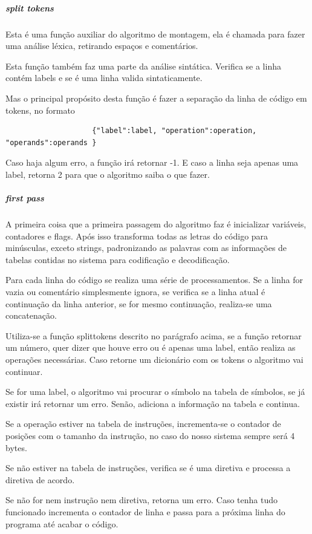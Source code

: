 			\subparagraph{split tokens}
				Esta é uma função auxiliar do algoritmo de montagem, ela é chamada para fazer uma análise léxica, retirando espaços e comentários. 

				Esta função também faz uma parte da análise sintática. Verifica se a linha contém labels e se é uma linha valida sintaticamente.

				Mas o principal propósito desta função é fazer a separação da linha de código em tokens, no formato

				\begin{verbatim}
					{"label":label, "operation":operation, "operands":operands }
				\end{verbatim}

				Caso haja algum erro, a função irá retornar -1. E caso a linha seja apenas uma label, retorna 2 para que o algoritmo saiba o que fazer.

			\subparagraph{first pass}						
				
				A primeira coisa que a primeira passagem do algoritmo faz é inicializar variáveis, contadores e flags. Após isso transforma todas as letras do código para minúsculas, exceto strings, padronizando as palavras com as informações de tabelas contidas no sistema para codificação e decodificação.

				Para cada linha do código se realiza uma série de processamentos. Se a linha for vazia ou comentário simplesmente ignora, se verifica se a linha atual é continuação da linha anterior, se for mesmo continuação, realiza-se uma concatenação.

				Utiliza-se a função split\textunderscore tokens descrito no parágrafo acima, se a função retornar um número, quer dizer que houve erro ou é apenas uma label, então realiza as operações necessárias. Caso retorne um dicionário com os tokens o algoritmo vai continuar.

				Se for uma label, o algoritmo vai procurar o símbolo na tabela de símbolos, se já existir irá retornar um erro. Senão, adiciona a informação na tabela e continua.

				Se a operação estiver na tabela de instruções, incrementa-se o contador de posições com o tamanho da instrução, no caso do nosso sistema sempre será 4 bytes.

				Se não estiver na tabela de instruções, verifica se é uma diretiva e processa a diretiva de acordo.

				Se não for nem instrução nem diretiva, retorna um erro. Caso tenha tudo funcionado incrementa o contador de linha e passa para a próxima linha do programa até acabar o código.

